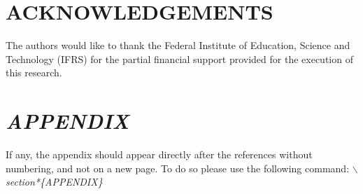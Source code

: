 \documentclass[a4paper,twoside]{article}
\begin{document}

\section*{ACKNOWLEDGEMENTS}

The authors would like to thank the Federal Institute of Education, Science and
Technology (IFRS) for the partial financial support provided for the execution
of this research.


{\small
}

\section*{\uppercase{\textit{Appendix}}}

If any, the appendix should appear directly after the
references without numbering, and not on a new page. To do so please use the
following command: \textit{$\backslash$section*\{APPENDIX\}}
\end{document}
